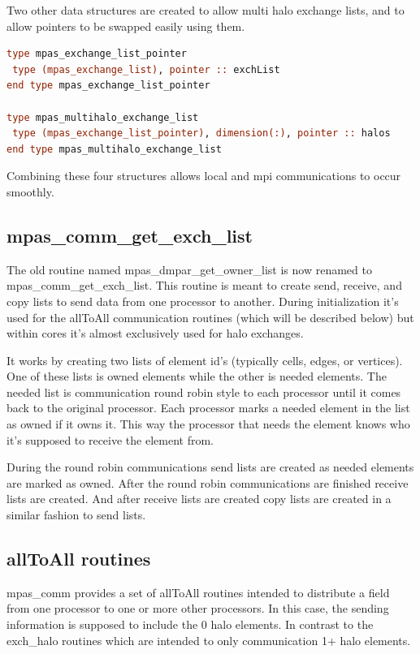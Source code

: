 \documentclass[11pt]{report}
\begin{document}
Two other data structures are created to allow multi halo exchange lists, and to allow pointers to be swapped easily using them.

\begin{lstlisting}[language=fortran,escapechar=@,frame=single]
type mpas_exchange_list_pointer
 type (mpas_exchange_list), pointer :: exchList
end type mpas_exchange_list_pointer

type mpas_multihalo_exchange_list
 type (mpas_exchange_list_pointer), dimension(:), pointer :: halos
end type mpas_multihalo_exchange_list
\end{lstlisting}

Combining these four structures allows local and mpi communications to occur smoothly.

\subsection{mpas\_comm\_get\_exch\_list}
The old routine named mpas\_dmpar\_get\_owner\_list is now renamed to mpas\_comm\_get\_exch\_list. This routine is meant to create send, receive, and copy lists to send data from one processor to another. During initialization it's used for the allToAll communication routines (which will be described below) but within cores it's almost exclusively used for halo exchanges.

It works by creating two lists of element id's (typically cells, edges, or vertices). One of these lists is owned elements while the other is needed elements. The needed list is communication round robin style to each processor until it comes back to the original processor. Each processor marks a needed element in the list as owned if it owns it. This way the processor that needs the element knows who it's supposed to receive the element from.

During the round robin communications send lists are created as needed elements are marked as owned. After the round robin communications are finished receive lists are created. And after receive lists are created copy lists are created in a similar fashion to send lists.

\subsection{allToAll routines}
mpas\_comm provides a set of allToAll routines intended to distribute a field from one processor to one or more other processors. In this case, the sending information is supposed to include the 0 halo elements. In contrast to the exch\_halo routines which are intended to only communication 1+ halo elements.
\end{document}
